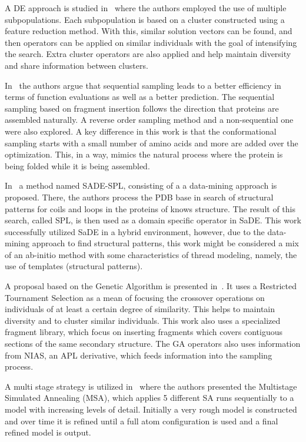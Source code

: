 A \ac{DE} approach is studied in~\cite{hao2017conformational} where the authors
employed the use of multiple subpopulations. Each subpopulation is based on a cluster
constructed using a feature reduction method. With this, similar solution vectors
can be found, and then operators can be applied on similar individuals with the goal
of intensifying the search. Extra cluster operators are also applied and help
maintain diversity and share information between clusters.


In~\cite{de2017sequential} the authors argue that sequential sampling leads to a better
efficiency in terms of function evaluations as well as a better prediction. The sequential
sampling based on fragment insertion follows the direction that proteins are assembled
naturally. A reverse order sampling method and a non-sequential one were also explored.
A key difference in this work is that the conformational sampling starts with a small
number of amino acids and more are added over the optimization. This, in a way, mimics
the natural process where the protein is being folded while it is being assembled.


In~\cite{oliveira2017sade} a method named SADE-SPL, consisting of a a data-mining
approach is proposed. There, the authors process the PDB base in search of structural patterns
for coils and loops in the proteins of knows structure. The result of this search, called
SPL, is then used as a domain specific operator in \ac{SaDE}. This work successfully utilized
\ac{SaDE} in a hybrid environment, however, due to the data-mining approach to find structural
patterns, this work might be considered a mix of an ab-initio method with some
characteristics of thread modeling, namely, the use of templates (structural patterns).

A proposal based on the Genetic Algorithm is presented in~\cite{borguesan2018genetic}. It uses
a Restricted Tournament Selection as a mean of focusing the crossover operations on individuals
of at least a certain degree of similarity. This helps to maintain diversity and to cluster
similar individuals. This work also uses a specialized fragment library,
which focus on inserting fragments which covers contiguous sections of the same secondary structure.
The \ac{GA} operators also uses information from NIAS, an \ac{APL} derivative,
which feeds information into the sampling process.

A multi stage strategy is utilized in~\cite{silva2018multistage} where the authors
presented the Multistage Simulated Annealing (MSA), which applies 5 different
SA runs sequentially to a model with increasing levels of detail. Initially a
very rough model is constructed and over time it is refined until a full atom
configuration is used and a final refined model is output.

